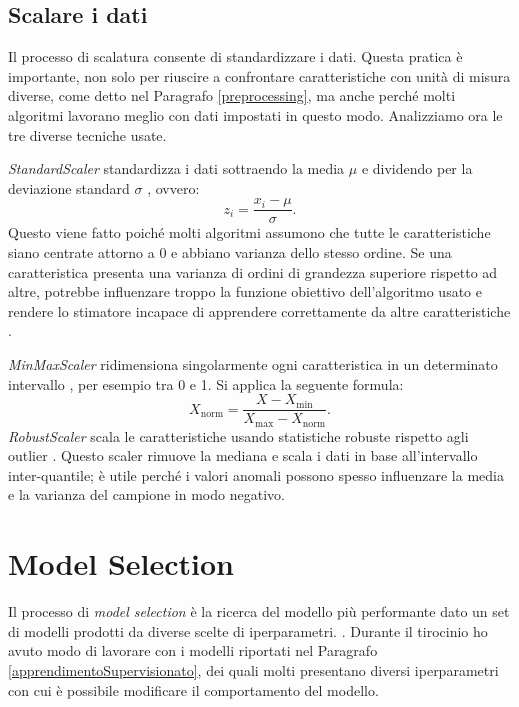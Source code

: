 \documentclass[12pt,italian]{report}
\begin{document}
\subsection{Scalare i dati}
Il processo di scalatura consente di standardizzare i dati. Questa pratica è importante, non solo per riuscire a confrontare caratteristiche con unità di misura diverse, come detto nel Paragrafo \ref{preprocessing}, ma anche perché molti algoritmi lavorano meglio con dati impostati in questo modo.  
Analizziamo ora le tre diverse tecniche usate.

\emph{StandardScaler} standardizza i dati sottraendo la media $\mu$ e dividendo per la deviazione standard $\sigma$ \cite{scikit-learn}, ovvero:
\begin{equation}
z_i = \frac{x_i - \mu}{\sigma}.
\end{equation}
Questo viene fatto poiché molti algoritmi assumono che tutte le caratteristiche siano centrate attorno a 0 e abbiano varianza dello stesso ordine. Se una caratteristica presenta una varianza di ordini di grandezza superiore rispetto ad altre, potrebbe influenzare troppo la funzione obiettivo dell'algoritmo usato e rendere lo stimatore incapace di apprendere correttamente da altre caratteristiche \cite{scikit-learn}.

\emph{MinMaxScaler} ridimensiona singolarmente ogni caratteristica in un determinato intervallo \cite{scikit-learn}, per esempio tra 0 e 1. Si applica la seguente formula:
\begin{equation}
X_{\mathrm{norm}} = \frac{X - X_{\mathrm{min}}}{X_{\mathrm{max}} - X_{\mathrm{norm}}}.
\end{equation}
\emph{RobustScaler} scala le caratteristiche usando statistiche robuste rispetto agli outlier \cite{scikit-learn}. Questo scaler rimuove la mediana e scala i dati in base all'intervallo inter-quantile; è utile perché i valori anomali possono spesso influenzare la media e la  varianza del campione in modo negativo.

\section{Model Selection}
\label{modelselection}
Il processo di \emph{model selection} è la ricerca del modello più performante dato un set di modelli prodotti da diverse scelte di iperparametri. \cite{Raschka2018ModelEM}.
Durante il tirocinio ho avuto modo di lavorare con i modelli riportati nel Paragrafo \ref{apprendimentoSupervisionato}, dei quali molti presentano diversi iperparametri con cui è possibile modificare il comportamento del modello. 
 
\end{document}
